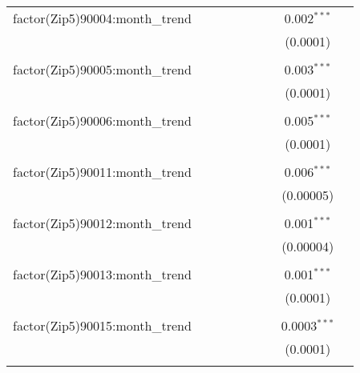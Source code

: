 \begin{table}[H]
{\begin{tabular}{@{\extracolsep{5pt}}lcccccccc}
  factor(Zip5)90004:month\_trend &  &  &  &  &  &  & 0.002$^{***}$ &  \\  

   &  &  &  &  &  &  & (0.0001) &  \\  

   & & & & & & & & \\  

  factor(Zip5)90005:month\_trend &  &  &  &  &  &  & 0.003$^{***}$ &  \\  

   &  &  &  &  &  &  & (0.0001) &  \\  

   & & & & & & & & \\  

  factor(Zip5)90006:month\_trend &  &  &  &  &  &  & 0.005$^{***}$ &  \\  

   &  &  &  &  &  &  & (0.0001) &  \\  

   & & & & & & & & \\  

  factor(Zip5)90011:month\_trend &  &  &  &  &  &  & 0.006$^{***}$ &  \\  

   &  &  &  &  &  &  & (0.00005) &  \\  

   & & & & & & & & \\  

  factor(Zip5)90012:month\_trend &  &  &  &  &  &  & 0.001$^{***}$ &  \\  

   &  &  &  &  &  &  & (0.00004) &  \\  

   & & & & & & & & \\  

  factor(Zip5)90013:month\_trend &  &  &  &  &  &  & 0.001$^{***}$ &  \\  

   &  &  &  &  &  &  & (0.0001) &  \\  

   & & & & & & & & \\  

  factor(Zip5)90015:month\_trend &  &  &  &  &  &  & 0.0003$^{***}$ &  \\  

   &  &  &  &  &  &  & (0.0001) &  \\  

   & & & & & & & & \\  


\end{tabular}}
\end{table}
